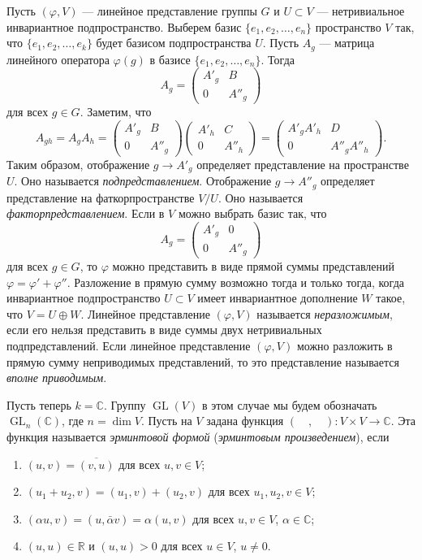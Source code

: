 \documentclass[12pt, titlepage, oneside]{amsbook}
\newcommand{\GL}{\operatorname{GL}}
\newcommand{\RR}{\mathbb{R}}
\newcommand{\CC}{\mathbb{C}}
\theoremstyle{definition}
\theoremstyle{remark}
\begin{document}
Пусть $(\varphi,V)$ --- линейное представление группы $G$ и $U\subset V$ --- нетривиальное инвариантное подпространство. Выберем базис $\{e_1,e_2,\ldots, e_n\}$ пространство $V$ так, что $\{e_1,e_2,\ldots, e_k\}$ будет базисом подпространства $U$. Пусть $A_g$ --- матрица линейного оператора $\varphi(g)$ в базисе $\{e_1,e_2,\ldots, e_n\}$. Тогда $$A_g=\begin{pmatrix} A'_g & B     \\
                0    & A''_g\end{pmatrix}$$ для всех $g\in G$. Заметим, что $$A_{gh}=A_gA_h=\begin{pmatrix} A'_g & B     \\
                0    & A''_g\end{pmatrix}\begin{pmatrix} A'_h & C     \\
                0    & A''_h\end{pmatrix}=\begin{pmatrix} A'_gA'_h & D          \\
                0        & A''_gA''_h\end{pmatrix}.$$ Таким образом, отображение $g\rightarrow A'_g$ определяет представление на пространстве $U$. Оно называется \emph{подпредставлением}. Отображение $g\rightarrow A''_g$ определяет представление на фаткорпространстве $V/U$. Оно называется \emph{факторпредставлением}. Если в $V$ можно выбрать базис так, что $$A_g=\begin{pmatrix} A'_g & 0     \\
                0    & A''_g\end{pmatrix}$$ для всех $g\in G$, то $\varphi$ можно представить в виде прямой суммы представлений $\varphi=\varphi'+\varphi''$. Разложение в прямую сумму возможно тогда и только тогда, когда инвариантное подпространство $U\subset V$ имеет инвариантное дополнение $W$ такое, что $V=U\oplus W$. Линейное представление $(\varphi,V)$ называется \emph{неразложимым}, если его нельзя представить в виде суммы двух нетривиальных подпредставлений. Если линейное представление $(\varphi,V)$ можно разложить в прямую сумму неприводимых представлений, то это представление называется \emph{вполне приводимым}.

Пусть теперь $k=\CC$. Группу $\GL(V)$ в этом случае мы будем обозначать $\GL_n(\CC)$, где $n=\dim V$. Пусть на $V$ задана функция $(\quad,\quad)\colon V\times V\rightarrow\CC$. Эта функция называется \emph{эрминтовой формой} (\emph{эрминтовым произведением}), если
\begin{enumerate}
	\item $(u,v)=\overline{(v,u)}$ для всех $u,v\in V$;
	\item $(u_1+u_2,v)=(u_1,v)+(u_2,v)$ для всех $u_1,u_2,v\in V$;
	\item $(\alpha u,v)=(u,\bar{\alpha}v)=\alpha(u,v)$ для всех $u,v\in V$, $\alpha\in\CC$;
	\item $(u,u)\in\RR$ и $(u,u)>0$ для всех $u\in V$, $u\neq 0$.
\end{enumerate}
\end{document}
